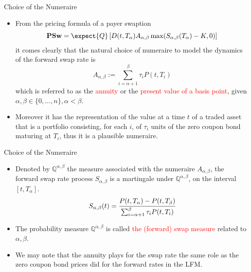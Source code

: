 \documentclass{beamer}
\begin{document}
\begin{frame}{Choice of the Numeraire}
	\begin{itemize}
		\item<1-> From the pricing formula of a payer swaption
		\begin{equation*}
			\textbf{PSw}=\expect{Q}\left[D(t,T_\alpha)A_{\alpha,\beta}\max(S_{\alpha,\beta}(T_\alpha)-K, 0)\right]
		\end{equation*}
		it comes clearly that the natural choice of numeraire to model the dynamics of the forward swap rate is
		\begin{equation*}
			A_{\alpha,\beta} := \sum^\beta_{i=\alpha+1}\tau_i P(t, T_i)
		\end{equation*}
		which is referred to as the \textcolor{red}{annuity} or the \textcolor{red}{present value of a basis point}, given $\alpha, \beta \in \{0,\ldots, n\}, \alpha < \beta$. 
	  \item<2-> Moreover it has the representation of the value at a time $t$ of a traded asset that is a portfolio consisting, for each $i$, of $\tau_i$ units of the zero coupon bond maturing at $T_i$, thus it is a plausible numeraire.
	\end{itemize}
\end{frame}

\begin{frame}{Choice of the Numeraire}
  \begin{itemize}
  \item<1-> Denoted by $\mathbb{Q}^{\alpha,\beta}$ the measure associated with the numeraire $A_{\alpha,\beta}$, the forward swap rate process $S_{\alpha,\beta}$ is a martingale under $\mathbb{Q}^{\alpha,\beta}$, on the interval $[t, T_\alpha]$.
  \begin{equation*}
  	S_{\alpha,\beta}(t) = \cfrac{P(t,T_\alpha)-P(t,T_\beta)}{\sum_{i=\alpha+1}^{\beta}\tau_iP(t,T_i)}
  \end{equation*}
  \item<2-> The probability measure $\mathbb{Q}^{\alpha,\beta}$ is called \textcolor{red}{the (forward) swap measure} related to $\alpha, \beta$.
  \item<2-> We may note that the annuity plays for the swap rate the same role as the zero coupon bond prices did for the forward rates in the LFM. 
  \end{itemize}
\end{frame}
\end{document}
